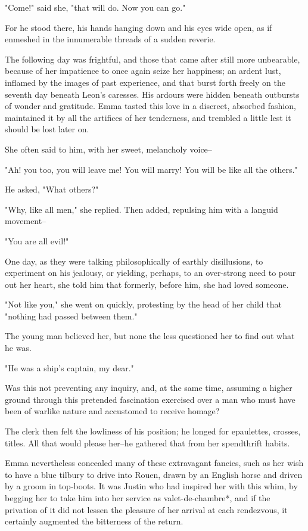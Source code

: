 \documentclass{tufte-book}
\begin{document}
"Come!" said she, "that will do. Now you can go."

For he stood there, his hands hanging down and his eyes wide open, as if
enmeshed in the innumerable threads of a sudden reverie.

The following day was frightful, and those that came after still more
unbearable, because of her impatience to once again seize her happiness;
an ardent lust, inflamed by the images of past experience, and that
burst forth freely on the seventh day beneath Leon's caresses. His
ardours were hidden beneath outbursts of wonder and gratitude. Emma
tasted this love in a discreet, absorbed fashion, maintained it by all
the artifices of her tenderness, and trembled a little lest it should be
lost later on.

She often said to him, with her sweet, melancholy voice--

"Ah! you too, you will leave me! You will marry! You will be like all
the others."

He asked, "What others?"

"Why, like all men," she replied. Then added, repulsing him with a
languid movement--

"You are all evil!"

One day, as they were talking philosophically of earthly disillusions,
to experiment on his jealousy, or yielding, perhaps, to an over-strong
need to pour out her heart, she told him that formerly, before him, she
had loved someone.

"Not like you," she went on quickly, protesting by the head of her child
that "nothing had passed between them."

The young man believed her, but none the less questioned her to find out
what he was.

"He was a ship's captain, my dear."

Was this not preventing any inquiry, and, at the same time, assuming a
higher ground through this pretended fascination exercised over a man
who must have been of warlike nature and accustomed to receive homage?

The clerk then felt the lowliness of his position; he longed for
epaulettes, crosses, titles. All that would please her--he gathered that
from her spendthrift habits.

Emma nevertheless concealed many of these extravagant fancies, such as
her wish to have a blue tilbury to drive into Rouen, drawn by an English
horse and driven by a groom in top-boots. It was Justin who had inspired
her with this whim, by begging her to take him into her service as
valet-de-chambre*, and if the privation of it did not lessen the
pleasure of her arrival at each rendezvous, it certainly augmented the
bitterness of the return.
\end{document}
